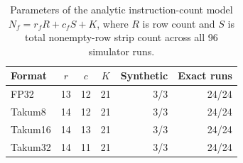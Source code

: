 \begin{table}[t]
\caption{Parameters of the analytic instruction-count model $N_f = r_f R + c_f S + K$, where $R$ is row count and $S$ is total nonempty-row strip count across all 96 simulator runs.}
\label{tab:modelo}
\centering
\scriptsize
\setlength{\tabcolsep}{3.0pt}
\renewcommand{\arraystretch}{0.95}
\begin{tabular}{@{}lcccrr@{}}
\toprule
Format & $r$ & $c$ & $K$ & Synthetic & Exact runs \\
\midrule
FP32 & 13 & 12 & 21 & 3/3 & 24/24 \\
Takum8 & 14 & 12 & 21 & 3/3 & 24/24 \\
Takum16 & 14 & 13 & 21 & 3/3 & 24/24 \\
Takum32 & 14 & 11 & 21 & 3/3 & 24/24 \\
\bottomrule
\end{tabular}
\end{table}
